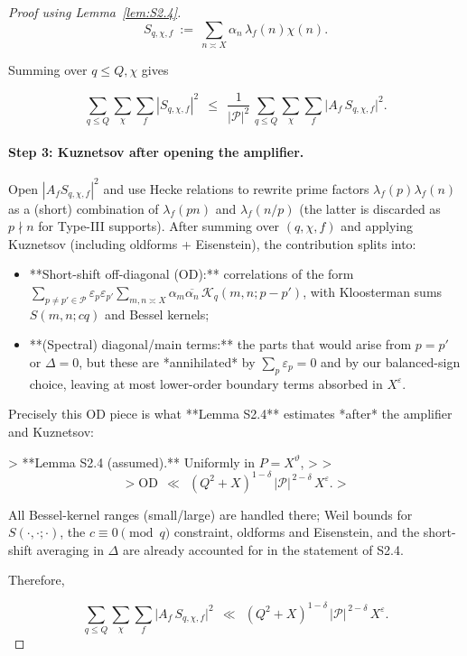 \documentclass[11pt]{article}
\theoremstyle{definition}
\theoremstyle{remark}
\begin{document}
\begin{proof}[Proof using Lemma~\ref{lem:S2.4}]
$$
S_{q,\chi,f}\ :=\ \sum_{n\asymp X}\alpha_n\,\lambda_f(n)\chi(n).
$$

Summing over $q\le Q,\chi$ gives

\begin{equation}
\sum_{q\le Q}\sum_{\chi}\sum_f |S_{q,\chi,f}|^2
\ \ \le\ \ \frac{1}{|\mathcal P|^2}\,
\sum_{q\le Q}\sum_{\chi}\sum_f \big|A_f\,S_{q,\chi,f}\big|^2.
\tag{3.1}
\end{equation}

\paragraph{Step 3: Kuznetsov after opening the amplifier.}
Open $|A_f S_{q,\chi,f}|^2$ and use Hecke relations to rewrite prime factors $\lambda_f(p)\lambda_f(n)$ as a (short) combination of $\lambda_f(pn)$ and $\lambda_f(n/p)$ (the latter is discarded as $p\nmid n$ for Type-III supports). After summing over $(q,\chi,f)$ and applying Kuznetsov (including oldforms + Eisenstein), the contribution splits into:

\begin{itemize}
\item **Short-shift off-diagonal (OD):** correlations of the form
  $\sum_{p\neq p'\in\mathcal P}\varepsilon_p\varepsilon_{p'}\sum_{m,n\asymp X}\alpha_m\overline{\alpha_n}\, \mathcal{K}_{q}(m, n; p-p')$,
  with Kloosterman sums $S(m,n;cq)$ and Bessel kernels;
\item **(Spectral) diagonal/main terms:** the parts that would arise from $p=p'$ or $\Delta=0$, but these are *annihilated* by $\sum_p\varepsilon_p=0$ and by our balanced-sign choice, leaving at most lower-order boundary terms absorbed in $X^{\varepsilon}$.
\end{itemize}

Precisely this OD piece is what **Lemma S2.4** estimates *after* the amplifier and Kuznetsov:

> **Lemma S2.4 (assumed).** Uniformly in $P=X^\vartheta$,
>
> $$
> \mathrm{OD}\ \ \ll\ \ (Q^2+X)^{1-\delta}\,|\mathcal P|^{\,2-\delta}\,X^{\varepsilon}.
> $$

All Bessel-kernel ranges (small/large) are handled there; Weil bounds for $S(\cdot,\cdot;\cdot)$, the $c\equiv0\pmod q$ constraint, oldforms and Eisenstein, and the short-shift averaging in $\Delta$ are already accounted for in the statement of S2.4.

Therefore,

\begin{equation}
\sum_{q\le Q}\sum_{\chi}\sum_f \big|A_f\,S_{q,\chi,f}\big|^2
\ \ \ll\ \ (Q^2+X)^{1-\delta}\,|\mathcal P|^{\,2-\delta}\,X^{\varepsilon}.
\tag{3.2}
\end{equation}



\end{proof}
\end{document}
